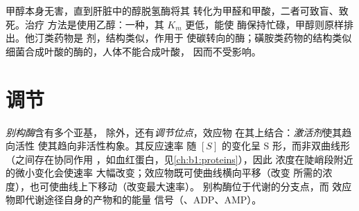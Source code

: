 \begin{example}[竞争作为药物]\label{ex:b1:enzymes:medicine}
甲醇本身无害，直到肝脏中的醇脱氢酶将其
转化为甲醛和甲酸，二者可致盲、致死。治疗
方法是使用乙醇：一种，其 $K_m$ 更低，能使
酶保持忙碌，甲醇则原样排出。他汀类药物是
剂，结构类似，作用于
使碳转向的酶；磺胺类药物的结构类似
细菌合成叶酸的酶的，人体不能合成叶酸，
因而不受影响。
\end{example}

\section{调节}

\begin{definition}[别构酶]\label{def:b1:enzymes:allosteric}
\emph{别构酶}含有多个亚基，
除外，还有\emph{调节位点}，效应物
在其上结合：\emph{激活剂}使其趋向活性
\emph{}使其趋向非活性构象。其反应速率
随 $[S]$ 的变化呈 S 形，而非双曲线形（之间存在协同作用
，如血红蛋白，见\cref{ch:b1:proteins}），因此
浓度在陡峭段附近的微小变化会使速率
大幅改变；效应物既可使曲线横向平移（改变
所需的浓度），也可使曲线上下移动（改变最大速率）。
别构酶位于代谢的分支点，而
效应物即代谢途径自身的产物和的能量
信号（、ADP、AMP）。
\end{definition}

